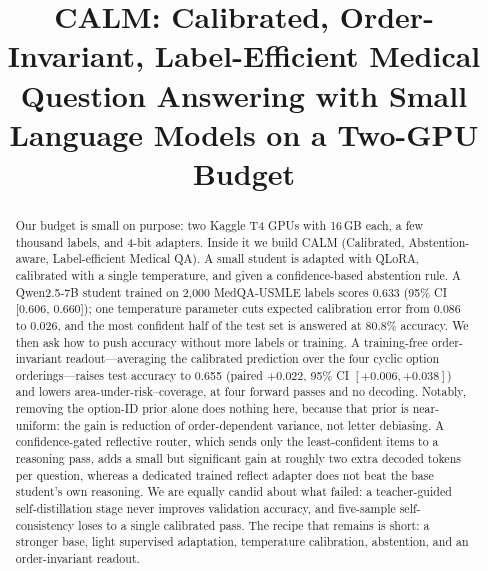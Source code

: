 \documentclass[conference]{IEEEtran}
\begin{document}
\title{CALM: Calibrated, Order-Invariant, Label-Efficient Medical Question Answering with Small Language Models on a Two-GPU Budget}

\author{
\and
{}
\and
{}
}

\maketitle

\begin{abstract}
Our budget is small on purpose: two Kaggle T4 GPUs with 16\,GB each, a few thousand labels, and 4-bit adapters. Inside it we build CALM (Calibrated, Abstention-aware, Label-efficient Medical QA). A small student is adapted with QLoRA, calibrated with a single temperature, and given a confidence-based abstention rule. A Qwen2.5-7B student trained on 2{,}000 MedQA-USMLE labels scores 0.633 (95\% CI [0.606, 0.660]); one temperature parameter cuts expected calibration error from 0.086 to 0.026, and the most confident half of the test set is answered at 80.8\% accuracy. We then ask how to push accuracy without more labels or training. A training-free order-invariant readout---averaging the calibrated prediction over the four cyclic option orderings---raises test accuracy to 0.655 (paired $+0.022$, 95\% CI $[+0.006,+0.038]$) and lowers area-under-risk--coverage, at four forward passes and no decoding. Notably, removing the option-ID prior alone does nothing here, because that prior is near-uniform: the gain is reduction of order-dependent variance, not letter debiasing. A confidence-gated reflective router, which sends only the least-confident items to a reasoning pass, adds a small but significant gain at roughly two extra decoded tokens per question, whereas a dedicated trained reflect adapter does not beat the base student's own reasoning. We are equally candid about what failed: a teacher-guided self-distillation stage never improves validation accuracy, and five-sample self-consistency loses to a single calibrated pass. The recipe that remains is short: a stronger base, light supervised adaptation, temperature calibration, abstention, and an order-invariant readout.
\end{abstract}
\end{document}
